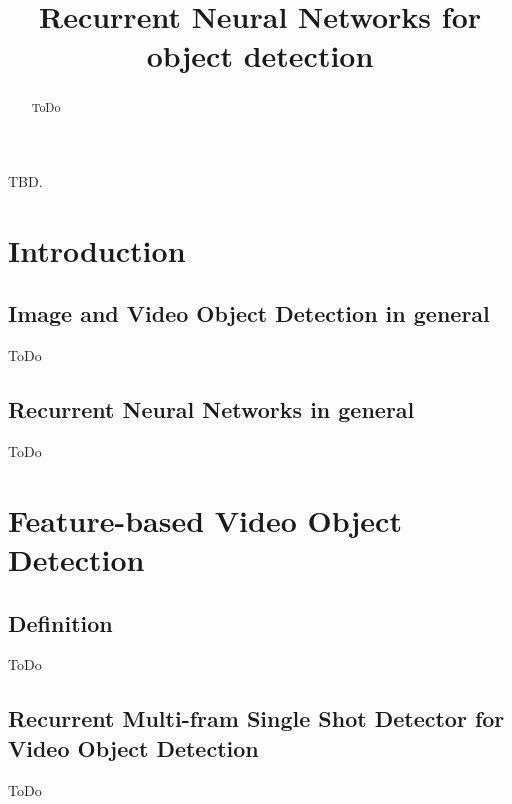 \documentclass[conference]{IEEEtran}
\begin{document}
\title{Recurrent Neural Networks for object detection}

\author{
\and
{}
}

\maketitle

\begin{abstract}
ToDo
\end{abstract}

\begin{IEEEkeywords}
TBD.
\end{IEEEkeywords}

\section{Introduction}

\subsection{Image and Video Object Detection in general}
ToDo

\subsection{Recurrent Neural Networks in general}
ToDo


\section{Feature-based Video Object Detection}

\subsection{Definition}
ToDo

\subsection{Recurrent Multi-fram Single Shot Detector for Video Object Detection}
ToDo
\end{document}
